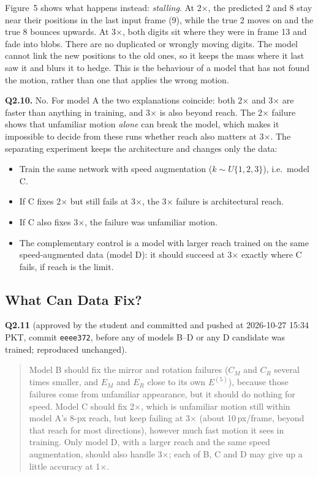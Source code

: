 Figure~5 shows what happens instead: \emph{stalling}. At 2$\times$, the predicted 2 and 8 stay near their positions
in the last input frame (9), while the true 2 moves on and the true 8 bounces upwards. At 3$\times$, both digits
sit where they were in frame 13 and fade into blobs. There are no duplicated or wrongly moving digits. The model
cannot link the new positions to the old ones, so it keeps the mass where it last saw it and blurs it to hedge.
This is the behaviour of a model that has not found the motion, rather than one that applies the wrong motion.

\textbf{Q2.10.} No. For model A the two explanations coincide: both 2$\times$ and 3$\times$ are faster than
anything in training, and 3$\times$ is also beyond reach. The 2$\times$ failure shows that unfamiliar motion
\emph{alone} can break the model, which makes it impossible to decide from these runs whether reach also matters
at 3$\times$. The separating experiment keeps the architecture and changes only the data:
\begin{itemize}
\item Train the same network with speed augmentation ($k\sim U\{1,2,3\}$), i.e.\ model C.
\item If C fixes 2$\times$ but still fails at 3$\times$, the 3$\times$ failure is architectural reach.
\item If C also fixes 3$\times$, the failure was unfamiliar motion.
\item The complementary control is a model with larger reach trained on the same speed-augmented data (model D):
it should succeed at 3$\times$ exactly where C fails, if reach is the limit.
\end{itemize}

\subsection{What Can Data Fix?}
\textbf{Q2.11} (approved by the student and committed and pushed at 2026-10-27 15:34 PKT, commit
\texttt{eeee372}, before any of models B--D or any D candidate was trained; reproduced unchanged).

\begin{quote}\small
Model B should fix the mirror and rotation failures ($C_M$ and $C_R$ several times smaller, and $E_M$ and $E_R$
close to its own $E^{(5)}$), because those failures come from unfamiliar appearance, but it should do nothing for
speed. Model C should fix 2$\times$, which is unfamiliar motion still within model A's 8-px reach, but keep failing
at 3$\times$ (about 10\,px/frame, beyond that reach for most directions), however much fast motion it sees in
training. Only model D, with a larger reach and the same speed augmentation, should also handle 3$\times$; each of
B, C and D may give up a little accuracy at 1$\times$.
\end{quote}

